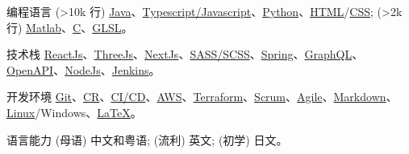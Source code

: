 
\begin{cvskills}
\cvskill
{编程语言}
{(>10k 行) \href{https://www.java.com/en/}{Java}、\href{https://www.javascript.com/}{Typescript/Javascript}、\href{https://www.python.org/}{Python}、\href{https://developer.mozilla.org/en-US/docs/Glossary/HTML5}{HTML}/\href{https://developer.mozilla.org/en-US/docs/Web/CSS}{CSS}; (>2k 行) \href{https://uk.mathworks.com/products/matlab.html}{Matlab}、\href{https://en.wikipedia.org/wiki/C_(programming_language)}{C}、\href{https://www.khronos.org/opengl/wiki/OpenGL_Shading_Language}{GLSL}。}

\cvskill
{技术栈}
{\href{https://reactjs.org/}{ReactJs}、\href{https://threejs.org/}{ThreeJs}、\href{https://nextjs.org/}{NextJs}、\href{https://sass-lang.com/}{SASS/SCSS}、\href{https://spring.io/}{Spring}、\href{https://graphql.org/}{GraphQL}、\href{https://swagger.io/specification/}{OpenAPI}、\href{https://nodejs.org/en/}{NodeJs}、\href{https://www.jenkins.io/}{Jenkins}。}

\cvskill
{开发环境}
{\href{https://git-scm.com/}{Git}、\href{https://en.wikipedia.org/wiki/Code_review}{CR}、\href{https://www.redhat.com/en/topics/devops/what-is-ci-cd}{CI/CD}、\href{https://aws.amazon.com/}{AWS}、\href{https://www.terraform.io/}{Terraform}、\href{https://www.scrum.org/resources/what-is-scrum}{Scrum}、\href{https://www.atlassian.com/agile}{Agile}、\href{https://en.wikipedia.org/wiki/Markdown}{Markdown}、\href{https://en.wikipedia.org/wiki/Unix}{Linux}/Windows、\href{https://www.latex-project.org/}{LaTeX}。}

\cvskill
{语言能力}
{(母语) 中文和粤语; (流利) 英文; (初学) 日文。}

\end{cvskills}